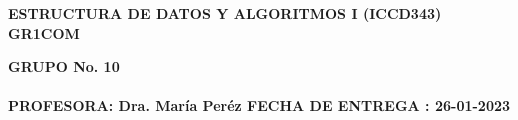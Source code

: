 \documentclass[10pt, a4paper]{article}
\begin{document}
\begin{center}
    \noindent \huge{\textbf{ESTRUCTURA DE DATOS Y ALGORITMOS I (ICCD343) GR1COM}}
\end{center}
\vspace{0.5cm}%
\begin{center}
    \noindent \huge{\textbf{GRUPO No. 10}}\\
    \\
    \vspace{ 0.5cm}
    \noindent \Large{ \textbf{PROFESORA: Dra. María Peréz\vspace{0.2cm} FECHA DE ENTREGA : 26-01-2023}}
\end{center}
\cleardoublepage
\newpage
\end{document}
